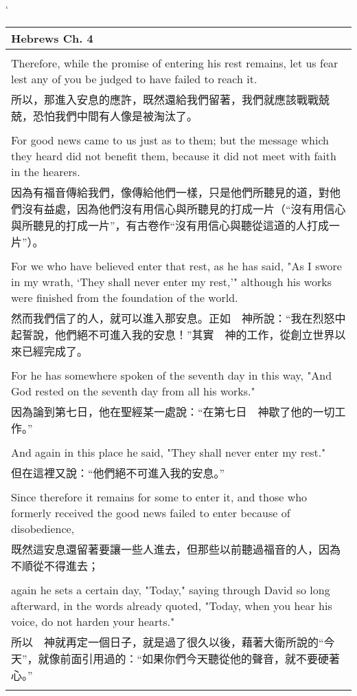 \newpage
`
\begin{tabularx}{\textwidth}{p{}}
\hline
Hebrews Ch. 4 \\
\hline \\
Therefore, while the promise of entering his rest remains, let us fear lest any of you be judged to have failed to reach it. \\
所以，那進入安息的應許，既然還給我們留著，我們就應該戰戰兢兢，恐怕我們中間有人像是被淘汰了。 \\ \\
For good news came to us just as to them; but the message which they heard did not benefit them, because it did not meet with faith in the hearers. \\
因為有福音傳給我們，像傳給他們一樣，只是他們所聽見的道，對他們沒有益處，因為他們沒有用信心與所聽見的打成一片（“沒有用信心與所聽見的打成一片”，有古卷作“沒有用信心與聽從這道的人打成一片”）。 \\ \\
For we who have believed enter that rest, as he has said, "As I swore in my wrath, `They shall never enter my rest,'" although his works were finished from the foundation of the world. \\
然而我們信了的人，就可以進入那安息。正如　神所說：“我在烈怒中起誓說，他們絕不可進入我的安息！”其實　神的工作，從創立世界以來已經完成了。 \\ \\
For he has somewhere spoken of the seventh day in this way, "And God rested on the seventh day from all his works." \\
因為論到第七日，他在聖經某一處說：“在第七日　神歇了他的一切工作。” \\ \\
And again in this place he said, "They shall never enter my rest." \\
但在這裡又說：“他們絕不可進入我的安息。” \\ \\
Since therefore it remains for some to enter it, and those who formerly received the good news failed to enter because of disobedience, \\
既然這安息還留著要讓一些人進去，但那些以前聽過福音的人，因為不順從不得進去； \\ \\
again he sets a certain day, "Today," saying through David so long afterward, in the words already quoted, "Today, when you hear his voice, do not harden your hearts." \\
所以　神就再定一個日子，就是過了很久以後，藉著大衛所說的“今天”，就像前面引用過的：“如果你們今天聽從他的聲音，就不要硬著心。” \\ \\

\end{tabularx}
